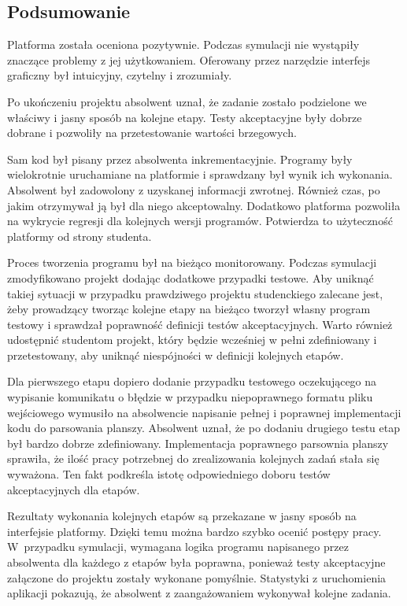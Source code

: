 \subsection{Podsumowanie}

Platforma została oceniona pozytywnie.
Podczas symulacji nie wystąpiły znaczące problemy z jej użytkowaniem.
Oferowany przez narzędzie interfejs graficzny był intuicyjny, czytelny i zrozumiały.

Po ukończeniu projektu absolwent uznał, że zadanie zostało podzielone we właściwy i jasny sposób na kolejne etapy.
Testy akceptacyjne były dobrze dobrane i pozwoliły na przetestowanie wartości brzegowych.

Sam kod był pisany przez absolwenta inkrementacyjnie.
Programy były wielokrotnie uruchamiane na platformie i sprawdzany był wynik ich wykonania.
Absolwent był zadowolony z uzyskanej informacji zwrotnej.
Również czas, po jakim otrzymywał ją był dla niego akceptowalny.
Dodatkowo platforma pozwoliła na wykrycie regresji dla kolejnych wersji programów.
Potwierdza to użyteczność platformy od strony studenta.

Proces tworzenia programu był na bieżąco monitorowany.
Podczas symulacji zmodyfikowano projekt dodając dodatkowe przypadki testowe.
Aby uniknąć takiej sytuacji w przypadku prawdziwego projektu studenckiego zalecane jest, żeby prowadzący tworząc kolejne etapy na bieżąco tworzył własny program testowy i sprawdzał poprawność definicji testów akceptacyjnych.
Warto również udostępnić studentom projekt, który będzie wcześniej w pełni zdefiniowany i przetestowany, aby uniknąć niespójności w definicji kolejnych etapów.

Dla pierwszego etapu dopiero dodanie przypadku testowego oczekującego na wypisanie komunikatu o błędzie w przypadku niepoprawnego formatu pliku wejściowego wymusiło na absolwencie napisanie pełnej i poprawnej implementacji kodu do parsowania planszy.
Absolwent uznał, że po dodaniu drugiego testu etap był bardzo dobrze zdefiniowany.
Implementacja poprawnego parsownia planszy sprawiła, że ilość pracy potrzebnej do zrealizowania kolejnych zadań stała się wyważona.
Ten fakt podkreśla istotę odpowiedniego doboru testów akceptacyjnych dla etapów.

Rezultaty wykonania kolejnych etapów są przekazane w jasny sposób na interfejsie platformy.
Dzięki temu można bardzo szybko ocenić postępy pracy.
W~przypadku symulacji, wymagana logika programu napisanego przez absolwenta dla każdego z etapów była poprawna, ponieważ testy akceptacyjne załączone do projektu zostały wykonane pomyślnie.
Statystyki z uruchomienia aplikacji pokazują, że absolwent z zaangażowaniem wykonywał kolejne zadania.


